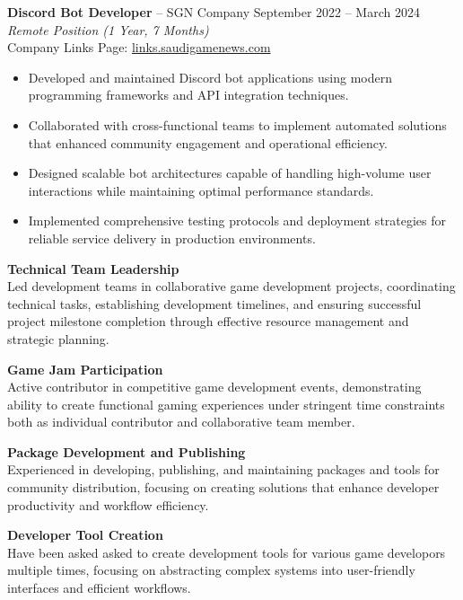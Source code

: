 \documentclass[a4paper,10pt]{article}
\begin{document}
\textbf{Discord Bot Developer} -- SGN Company \hfill September 2022 -- March 2024\\
\textit{Remote Position (1 Year, 7 Months)}\\
Company Links Page: \href{https://links.saudigamenews.com}{links.saudigamenews.com}
\begin{itemize}[nosep]
    \item Developed and maintained Discord bot applications using modern programming frameworks and API integration techniques.
    \item Collaborated with cross-functional teams to implement automated solutions that enhanced community engagement and operational efficiency.
    \item Designed scalable bot architectures capable of handling high-volume user interactions while maintaining optimal performance standards.
    \item Implemented comprehensive testing protocols and deployment strategies for reliable service delivery in production environments.
\end{itemize}

\addvspace{\medskipamount}

\textbf{Technical Team Leadership}\\
Led development teams in collaborative game development projects, coordinating technical tasks, establishing development timelines, and ensuring successful project milestone completion through effective resource management and strategic planning.

\addvspace{\medskipamount}

\textbf{Game Jam Participation}\\
Active contributor in competitive game development events, demonstrating ability to create functional gaming experiences under stringent time constraints both as individual contributor and collaborative team member.

\addvspace{\medskipamount}

\textbf{Package Development and Publishing}\\
Experienced in developing, publishing, and maintaining packages and tools for community distribution, focusing on creating solutions that enhance developer productivity and workflow efficiency.

\addvspace{\medskipamount}

\textbf{Developer Tool Creation}\\
Have been asked asked to create development tools for various game developors multiple times, focusing on abstracting complex systems into user-friendly interfaces and efficient workflows.\\
\end{document}
